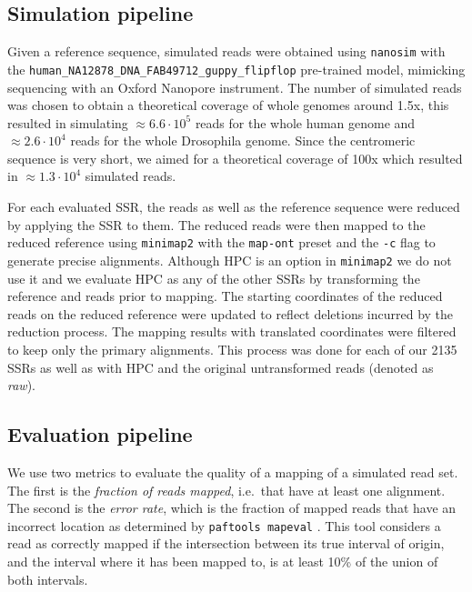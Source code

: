 \documentclass[
  11pt,
  twoside]{scrbook}
\begin{document}
\hypertarget{simulation-pipeline}{%
\subsection{Simulation pipeline}\label{simulation-pipeline}}

Given a reference sequence, simulated reads were obtained using \texttt{nanosim}
\autocite{yangNanoSimNanoporeSequence2017} with the
\texttt{human\_NA12878\_DNA\_FAB49712\_guppy\_flipflop} pre-trained model, mimicking
sequencing with an Oxford Nanopore instrument. The number of simulated reads was
chosen to obtain a theoretical coverage of whole genomes around 1.5x, this
resulted in simulating \(\approx 6.6\cdot10^5\) reads for the whole human genome
and \(\approx 2.6\cdot10^4\) reads for the whole Drosophila genome. Since the
centromeric sequence is very short, we aimed for a theoretical coverage of 100x
which resulted in \(\approx 1.3\cdot10^4\) simulated reads.

For each evaluated SSR, the reads as well as the reference sequence were reduced
by applying the SSR to them. The reduced reads were then mapped to the reduced
reference using \texttt{minimap2}\autocite{liMinimap2PairwiseAlignment2018} with the \texttt{map-ont}
preset and the \texttt{-c} flag to generate precise alignments. Although HPC is an
option in \texttt{minimap2} we do not use it and we evaluate HPC as any of the other
SSRs by transforming the reference and reads prior to mapping. The starting
coordinates of the reduced reads on the reduced reference were updated to
reflect deletions incurred by the reduction process. The mapping results with
translated coordinates were filtered to keep only the primary alignments. This
process was done for each of our 2135 SSRs as well as with HPC and the original
untransformed reads (denoted as \emph{raw}).

\hypertarget{sec:evalpipeline}{%
\subsection{Evaluation pipeline}\label{sec:evalpipeline}}

We use two metrics to evaluate the quality of a mapping of a simulated read set.
The first is the \emph{fraction of reads mapped}, i.e.~that have at least one
alignment. The second is the \emph{error rate}, which is the fraction of mapped reads
that have an incorrect location as determined by \texttt{paftools\ mapeval}
\autocite{liMinimap2PairwiseAlignment2018}. This tool considers a read as correctly
mapped if the intersection between its true interval of origin, and the interval
where it has been mapped to, is at least 10\% of the union of both intervals.
\end{document}
